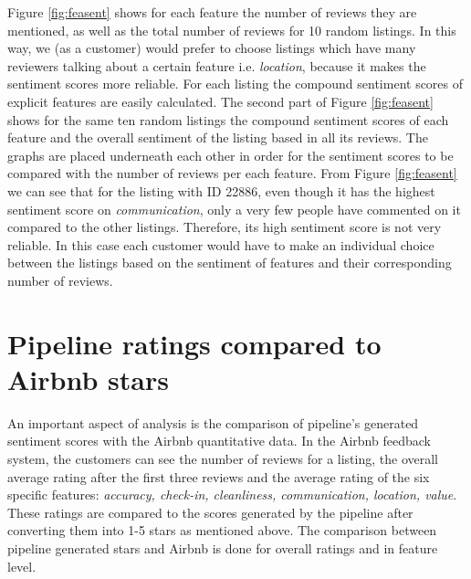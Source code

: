 Figure \ref{fig:feasent} shows for each feature the number of reviews they are mentioned, as well as the total number of reviews for 10 random listings. In this way, we (as a customer) would prefer to choose listings which have many reviewers talking about a certain feature i.e. \textit{location}, because it makes the sentiment scores more reliable. For each listing the compound sentiment scores of explicit features are easily calculated. The second part of Figure \ref{fig:feasent} shows for the same ten random listings the compound sentiment scores of each feature and the overall sentiment of the listing based in all its reviews. The graphs are placed underneath each other in order for the sentiment scores to be compared with the number of reviews per each feature. From Figure \ref{fig:feasent} we can see that for the listing with ID 22886, even though it has the highest sentiment score on \textit{communication}, only a very few people have commented on it compared to the other listings. Therefore, its high sentiment score is not very reliable. In this case each customer would have to make an individual choice between the listings based on the sentiment of features and their corresponding number of reviews. 

\section{Pipeline ratings compared to Airbnb stars}
An important aspect of analysis is the comparison of pipeline's generated sentiment scores with the Airbnb quantitative data. In the Airbnb feedback system, the customers can see the number of reviews for a listing, the overall average rating after the first three reviews and the average rating of the six specific features: \textit{accuracy, check-in, cleanliness, communication, location, value}. These ratings are compared to the scores generated by the pipeline after converting them into 1-5 stars as mentioned above. The comparison between pipeline generated stars and Airbnb is done for overall ratings and in feature level. 
